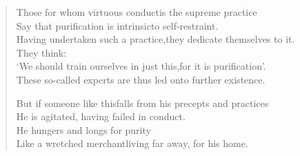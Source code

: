 \begin{verse}

 Those for whom virtuous conduct\newline is the supreme practice\\
Say that purification is intrinsic\newline to self-restraint.\\
Having undertaken such a practice,\newline they dedicate themselves to it.\\
They think:\\
`We should train ourselves in just this,\newline for it is purification'.\\
These so-called experts are thus led on\newline to further existence.


 But if someone like this\newline falls from his precepts and practices\\
He is agitated, having failed in conduct.\\
He hungers and longs for purity\\
Like a wretched merchant\newline living far away, for his home.



\end{verse}
